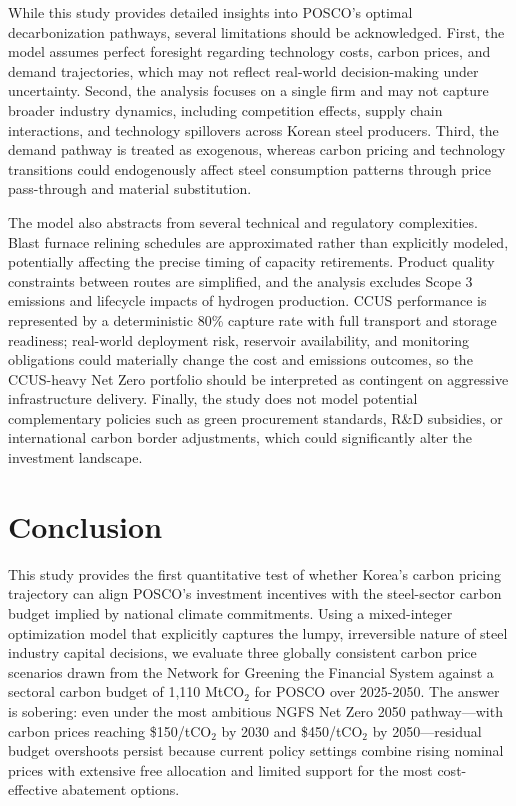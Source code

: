 \documentclass[preprint,1p,authoryear]{elsarticle}
\begin{document}
While this study provides detailed insights into POSCO's optimal decarbonization pathways, several limitations should be acknowledged. First, the model assumes perfect foresight regarding technology costs, carbon prices, and demand trajectories, which may not reflect real-world decision-making under uncertainty. Second, the analysis focuses on a single firm and may not capture broader industry dynamics, including competition effects, supply chain interactions, and technology spillovers across Korean steel producers. Third, the demand pathway is treated as exogenous, whereas carbon pricing and technology transitions could endogenously affect steel consumption patterns through price pass-through and material substitution.

The model also abstracts from several technical and regulatory complexities. Blast furnace relining schedules are approximated rather than explicitly modeled, potentially affecting the precise timing of capacity retirements. Product quality constraints between routes are simplified, and the analysis excludes Scope 3 emissions and lifecycle impacts of hydrogen production. CCUS performance is represented by a deterministic 80\% capture rate with full transport and storage readiness; real-world deployment risk, reservoir availability, and monitoring obligations could materially change the cost and emissions outcomes, so the CCUS-heavy Net Zero portfolio should be interpreted as contingent on aggressive infrastructure delivery. Finally, the study does not model potential complementary policies such as green procurement standards, R\&D subsidies, or international carbon border adjustments, which could significantly alter the investment landscape.

\section{Conclusion}

This study provides the first quantitative test of whether Korea's carbon pricing trajectory can align POSCO's investment incentives with the steel-sector carbon budget implied by national climate commitments. Using a mixed-integer optimization model that explicitly captures the lumpy, irreversible nature of steel industry capital decisions, we evaluate three globally consistent carbon price scenarios drawn from the Network for Greening the Financial System against a sectoral carbon budget of 1,110 MtCO$_2$ for POSCO over 2025-2050. The answer is sobering: even under the most ambitious NGFS Net Zero 2050 pathway—with carbon prices reaching \$150/tCO$_2$ by 2030 and \$450/tCO$_2$ by 2050—residual budget overshoots persist because current policy settings combine rising nominal prices with extensive free allocation and limited support for the most cost-effective abatement options.
\end{document}
